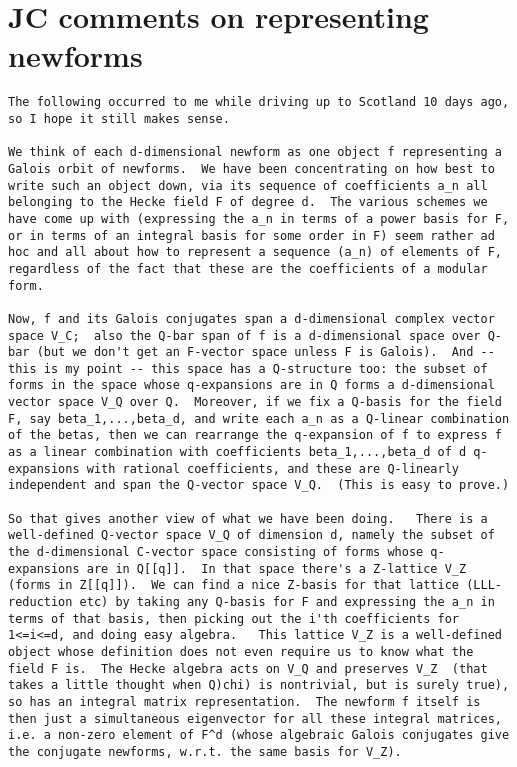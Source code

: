 \documentclass[11pt]{amsart}
\numberwithin{equation}{subsection}
\theoremstyle{definition}
\begin{document}
\section{JC comments on representing newforms}

\begin{verbatim}
The following occurred to me while driving up to Scotland 10 days ago, so I hope it still makes sense.

We think of each d-dimensional newform as one object f representing a Galois orbit of newforms.  We have been concentrating on how best to write such an object down, via its sequence of coefficients a_n all belonging to the Hecke field F of degree d.  The various schemes we have come up with (expressing the a_n in terms of a power basis for F, or in terms of an integral basis for some order in F) seem rather ad hoc and all about how to represent a sequence (a_n) of elements of F, regardless of the fact that these are the coefficients of a modular form.

Now, f and its Galois conjugates span a d-dimensional complex vector space V_C;  also the Q-bar span of f is a d-dimensional space over Q-bar (but we don't get an F-vector space unless F is Galois).  And -- this is my point -- this space has a Q-structure too: the subset of forms in the space whose q-expansions are in Q forms a d-dimensional vector space V_Q over Q.  Moreover, if we fix a Q-basis for the field F, say beta_1,...,beta_d, and write each a_n as a Q-linear combination of the betas, then we can rearrange the q-expansion of f to express f as a linear combination with coefficients beta_1,...,beta_d of d q-expansions with rational coefficients, and these are Q-linearly independent and span the Q-vector space V_Q.  (This is easy to prove.)

So that gives another view of what we have been doing.   There is a well-defined Q-vector space V_Q of dimension d, namely the subset of the d-dimensional C-vector space consisting of forms whose q-expansions are in Q[[q]].  In that space there's a Z-lattice V_Z (forms in Z[[q]]).  We can find a nice Z-basis for that lattice (LLL-reduction etc) by taking any Q-basis for F and expressing the a_n in terms of that basis, then picking out the i'th coefficients for 1<=i<=d, and doing easy algebra.   This lattice V_Z is a well-defined object whose definition does not even require us to know what the field F is.  The Hecke algebra acts on V_Q and preserves V_Z  (that takes a little thought when Q)chi) is nontrivial, but is surely true), so has an integral matrix representation.  The newform f itself is then just a simultaneous eigenvector for all these integral matrices, i.e. a non-zero element of F^d (whose algebraic Galois conjugates give the conjugate newforms, w.r.t. the same basis for V_Z).


\end{verbatim}
\end{document}
